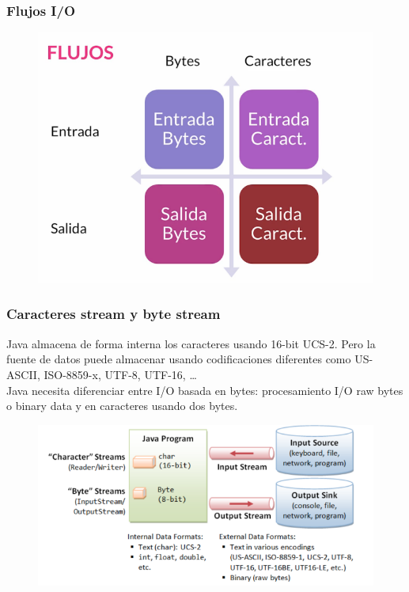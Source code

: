 \documentclass{beamer}
\begin{document}
\begin{frame}
\frametitle{Flujos I/O}
\begin{figure}
\includegraphics[scale=0.5]{imagenes/flujo1.png}
\end{figure}
\end{frame}

\begin{frame}[fragile]
\frametitle{Caracteres stream y byte stream}
Java almacena de forma interna los caracteres usando 16-bit  UCS-2. Pero la fuente de datos puede almacenar usando codificaciones diferentes como US-ASCII, ISO-8859-x, UTF-8, UTF-16, \dots\\
Java necesita diferenciar entre I/O basada en \alert{bytes}: procesamiento I/O raw bytes o binary data y en \alert{caracteres} usando dos bytes.\\
\begin{figure}
\includegraphics[scale=0.5]{imagenes/stream.png}
\end{figure}
\end{frame}
\end{document}
